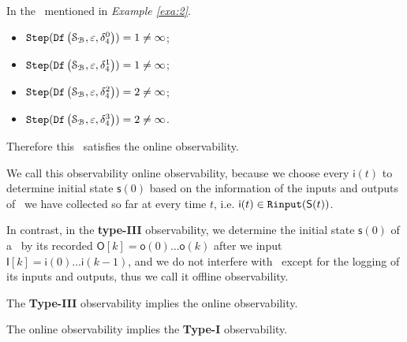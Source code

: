 \begin{example}
In the \BCN\ mentioned in {\em Example \ref{exa:2}}.  
 \begin{itemize}
 \item ${\tt Step}({\tt Df}\left(\mathcal{S}_{\mathcal{B}},\varepsilon, \delta_{4}^0\right))=1\ne \infty$;
 \item ${\tt Step}({\tt Df}\left(\mathcal{S}_{\mathcal{B}},\varepsilon, \delta_{4}^1\right))=1\ne \infty$;
 \item ${\tt Step}({\tt Df}\left(\mathcal{S}_{\mathcal{B}},\varepsilon, \delta_{4}^2\right))=2\ne \infty$;
 \item ${\tt Step}({\tt Df}\left(\mathcal{S}_{\mathcal{B}},\varepsilon, \delta_{4}^3\right))=2\ne \infty$.
 \end{itemize}
 
Therefore this \BCN\ satisfies the online observability.%
\label{exa:10}




We call this observability online observability, because we choose every $\mathsf{i}(t)$ to determine initial state $\mathsf{s}(0)$ based on the information of the inputs and outputs of \BCN\ we have collected so far at every time $t$, i.e. $\mathsf{i}(t)\in{\tt Rinput}(\mathsf{S}(t))$. 

In contrast, in the {\bf type-III} observability, we determine the initial state $\mathsf{s}(0)$ of a \BCN\ by its recorded $\mathsf{O}[k]=\mathsf{o}(0)\ldots\mathsf{o}(k)$ after we input $\mathsf{I}[k]=\mathsf{i}(0)\ldots\mathsf{i}(k-1)$, and  we do not interfere with \BCN\ except for the logging of its inputs and outputs, thus we call it offline observability.


\end{example}  

\begin{lemma}
The {\bf Type-III} observability implies the online observability.
\label{lemm:4}
\end{lemma}

\begin{lemma}
The online observability implies the  {\bf Type-I} observability.
\label{lemm:3}
\end{lemma}

